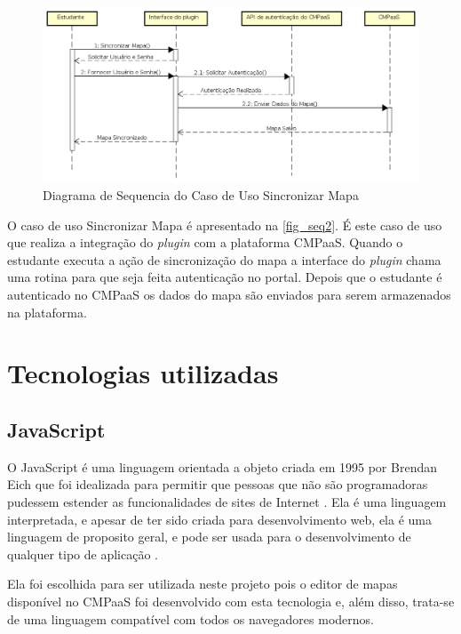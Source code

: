 \documentclass[
	12pt,				%
	openright,			%
	oneside,			%
	a4paper,			%
	english,			%
	french,				%
	spanish,			%
	brazil				%
	]{abntex2}
\begin{document}
\begin{figure}[htb]
	\caption{\label{fig_seq2} Diagrama de Sequencia do Caso de Uso Sincronizar Mapa}
	\begin{center}
		\includegraphics[scale=0.5]{SeqDiagramCmpaas.png}
	\end{center}
\end{figure} 

O caso de uso Sincronizar Mapa é apresentado na \autoref{fig_seq2}. É este caso de uso que realiza a integração do \textit{plugin} com a plataforma CMPaaS. Quando o estudante executa a ação de sincronização do mapa a interface do \textit{plugin} chama uma rotina para que seja feita autenticação no portal. Depois que o estudante é autenticado no CMPaaS os dados do mapa são enviados para serem armazenados na plataforma.

\section{Tecnologias utilizadas}

\subsection{JavaScript}

O JavaScript é uma linguagem orientada a objeto criada em 1995 por Brendan Eich que foi idealizada para permitir que pessoas que não são programadoras pudessem estender as funcionalidades de sites de Internet \cite{Richards2010}. Ela é uma linguagem interpretada, e apesar de ter sido criada para desenvolvimento web, ela é uma linguagem de proposito geral, e pode ser usada para o desenvolvimento de qualquer tipo de aplicação \cite{flanagan2006}.

Ela foi escolhida para ser utilizada neste projeto pois o editor de mapas disponível no CMPaaS foi desenvolvido com esta tecnologia e, além disso, trata-se de uma linguagem compatível com todos os navegadores modernos.  
\end{document}
